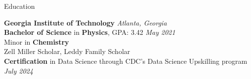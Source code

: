 \documentclass{resume} %
\begin{document}

\begin{rSection}{Education}

  {\bf Georgia Institute of Technology} \hfill {\em Atlanta, Georgia}
  \\ \textbf{Bachelor of Science} in \textbf{Physics}, GPA: 3.42 \hfill {\em May 2021}
  \\ Minor in \textbf{Chemistry}
  \\ Zell Miller Scholar, Leddy Family Scholar
  \\\textbf{Certification} in Data Science through CDC's Data Science Upskilling program \hfill {\em July 2024}
\end{rSection}
\end{document}
